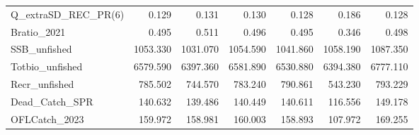 \documentclass[11pt,
  english,
]{article}
\begin{document}
\begin{landscape}
\begin{table}
{\begin{tabular}[t]{lrrrrrr}
Q\_extraSD\_REC\_PR(6) & 0.129 & 0.131 & 0.130 & 0.128 & 0.186 & 0.128\\
Bratio\_2021 & 0.495 & 0.511 & 0.496 & 0.495 & 0.346 & 0.498\\
SSB\_unfished & 1053.330 & 1031.070 & 1054.590 & 1041.860 & 1058.190 & 1087.350\\
Totbio\_unfished & 6579.590 & 6397.360 & 6581.890 & 6530.880 & 6394.380 & 6777.110\\
Recr\_unfished & 785.502 & 744.570 & 783.240 & 790.861 & 543.230 & 793.229\\
Dead\_Catch\_SPR & 140.632 & 139.486 & 140.449 & 140.611 & 116.556 & 149.178\\
OFLCatch\_2023 & 159.972 & 158.981 & 160.003 & 158.893 & 107.972 & 169.255\\
\bottomrule
\end{tabular}}
\end{table}
\end{landscape}
\end{document}
